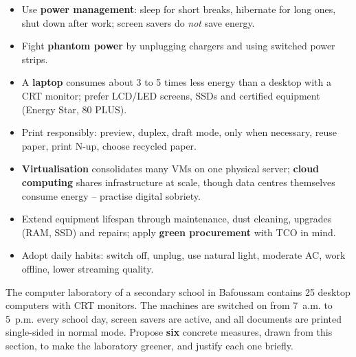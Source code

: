 \documentclass[11pt]{article}
\begin{document}
\begin{aretenir}
\begin{itemize}
\item Use \textbf{power management}: sleep for short breaks, hibernate for long ones, shut down after work; screen savers do \emph{not} save energy.
\item Fight \textbf{phantom power} by unplugging chargers and using switched power strips.
\item A \textbf{laptop} consumes about 3 to 5 times less energy than a desktop with a CRT monitor; prefer LCD/LED screens, SSDs and certified equipment (Energy Star, 80 PLUS).
\item Print responsibly: preview, duplex, draft mode, only when necessary, reuse paper, print N-up, choose recycled paper.
\item \textbf{Virtualisation} consolidates many VMs on one physical server; \textbf{cloud computing} shares infrastructure at scale, though data centres themselves consume energy -- practise digital sobriety.
\item Extend equipment lifespan through maintenance, dust cleaning, upgrades (RAM, SSD) and repairs; apply \textbf{green procurement} with TCO in mind.
\item Adopt daily habits: switch off, unplug, use natural light, moderate AC, work offline, lower streaming quality.
\end{itemize}
\end{aretenir}

\begin{exercice}
The computer laboratory of a secondary school in Bafoussam contains 25 desktop computers with CRT monitors. The machines are switched on from 7~a.m. to 5~p.m. every school day, screen savers are active, and all documents are printed single-sided in normal mode. Propose \textbf{six} concrete measures, drawn from this section, to make the laboratory greener, and justify each one briefly.
\end{exercice}
\end{document}
